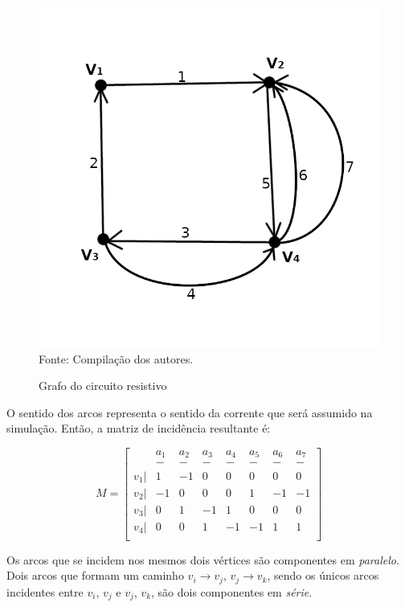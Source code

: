 \documentclass[twocolumn, 10pt]{extarticle}
\begin{document}
\begin{figure}[H]
	\caption{Grafo do circuito resistivo} 
	\centering
	\includegraphics[scale=1]{grcrc1}
	\\ Fonte: Compilação dos autores.
\end{figure}

O sentido dos arcos representa o sentido da corrente que será assumido na simulação. Então, a matriz de incidência resultante é:

\[
M = 
\begin{bmatrix}
 & a_1 & a_2 & a_3 & a_4 & a_5 & a_6 & a_7 \\
 & - & - & - & - & - & - & - \\
 v_1 |& 1  & -1 & 0  & 0  & 0  & 0  & 0  \\
 v_2 |& -1 & 0  & 0  & 0  & 1  & -1 & -1 \\
 v_3 |& 0  & 1  & -1 & 1  & 0  & 0  & 0  \\
 v_4 |& 0  & 0  & 1  & -1 & -1 & 1  & 1  \\
\end{bmatrix}
\]

Os arcos que se incidem nos mesmos dois vértices são componentes em \textit{paralelo}. Dois arcos que formam um caminho $v_i \to v_j$, $v_j \to v_k$, sendo os únicos arcos incidentes entre $v_i$, $v_j$ e $v_j$, $v_k$, são dois componentes em \textit{série}.
\end{document}
